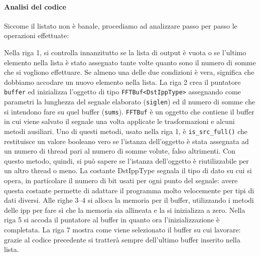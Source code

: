 \paragraph{Analisi del codice}
Siccome il listato non \`e banale, procediamo ad analizzare passo per passo le
operazioni effettuate:

Nella riga 1, si controlla innanzitutto se la lista di output \`e vuota o se
l'ultimo elemento nella lista \`e stato assegnato tante volte quanto sono il
numero di somme che si vogliono effettuare. Se almeno una delle due condizioni
\`e vera, significa che dobbiamo accodare un nuovo elemento nella lista. La riga
2 crea il puntatore \texttt{buffer} ed inizializza l'oggetto di tipo
\texttt{FFTBuf<DstIppType>} assegnando come parametri la lunghezza del segnale
elaborato (\texttt{siglen}) ed il numero di somme che si intendono fare su quel
buffer (\texttt{sums}). \texttt{FFTBuf} \`e un oggetto che contiene il buffer in
cui viene salvato il segnale una volta applicate le trasformazioni e alcuni
metodi ausiliari. Uno di questi metodi, usato nella riga 1, \`e
\texttt{is\_src\_full()} che restituisce un valore booleano vero se l'istanza
dell'oggetto \`e stata assegnata ad un numero di thread pari al numero di somme
volute, falso altrimenti. Con questo metodo, quindi, si pu\`o sapere se
l'istanza dell'oggetto \`e riutilizzabile per un altro thread o meno. La
costante DstIppType segnala il tipo di dato su cui si opera, in particolare il
numero di bit usati per ogni punto del segnale: avere questa costante permette
di adattare il programma molto velocemente per tipi di dati diversi. Alle righe
3--4 si alloca la memoria per il buffer, utilizzando i metodi delle \ac{ipp} per
fare s\`i che la memoria sia allineata e la si inizializza a zero.  Nella riga 5
si accoda il puntatore al buffer in quanto ora l'inizializzazione \`e
completata. La riga 7 mostra come viene selezionato il buffer su cui lavorare:
grazie al codice precedente si tratter\`a sempre dell'ultimo buffer inserito
nella lista.

